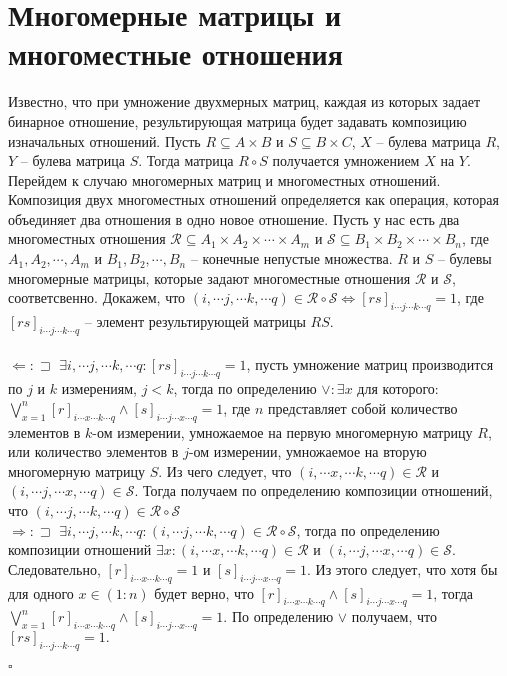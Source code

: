 \documentclass{article}
\begin{document}
\section{Многомерные матрицы и многоместные отношения}
Известно, что при умножение двухмерных матриц, каждая из которых задает бинарное отношение, результирующая матрица будет задавать композицию изначальных отношений. 
Пусть $R \subseteq A \times B$ и $S \subseteq B \times C$, $X$ -- булева матрица $R$, $Y$ -- булева матрица $S$. Тогда матрица $R \circ S $ получается умножением $X$ на $Y$.\\

Перейдем к случаю многомерных матриц и многоместных отношений. Композиция двух многоместных отношений определяется как операция, которая объединяет два отношения в одно новое отношение. Пусть у нас есть два многоместных отношения $\mathcal{R} \subseteq A_1 \times A_2 \times \cdots \times A_m$ и $\mathcal{S} \subseteq B_1 \times B_2 \times \cdots \times B_n$, где $A_1, A_2, \cdots, A_m$ и $B_1, B_2, \cdots, B_n$ -- конечные непустые множества. $R$ и $S$ -- булевы многомерные матрицы, которые задают многоместные отношения $\mathcal{R}$ и $\mathcal{S}$, соответсвенно. Докажем, что $(i, \cdots j, \cdots k, \cdots q) \in \mathcal{R} \circ \mathcal{S} \iff [rs]_{i \cdots j\cdots  k\cdots q} = 1$, где $[rs]_{i \cdots j\cdots k \cdots q}$ -- элемент результирующей матрицы $RS$.\\\\
$\Leftarrow :  \sqsupset$ $\exists i, \cdots j,\cdots k, \cdots q : [rs]_{i\cdots j\cdots k\cdots q} = 1$, пусть умножение матриц производится по $j$ и $k$ измерениям, $j<k$, тогда по определению $\vee : \exists x$ для которого: $\bigvee_{x=1}^n [r]_{i \cdots x \cdots k\cdots q} \wedge [s]_{i\cdots j \cdots x \cdots q} = 1$, где $n$ представляет собой количество элементов в $k$-ом измерении, умножаемое на первую многомерную матрицу $R$, или количество элементов в $j$-ом измерении, умножаемое на вторую многомерную матрицу $S$. Из чего следует, что $(i,\cdots x, \cdots k, \cdots q) \in \mathcal{R}$ и $(i,\cdots j,\cdots x,\cdots q) \in \mathcal{S}$. Тогда получаем по определению композиции отношений, что $(i,\cdots j,\cdots k, \cdots q) \in \mathcal{R} \circ \mathcal{S}$ \\
$\Rightarrow : \sqsupset$ $\exists i, \cdots j,\cdots k, \cdots q : (i,\cdots j,\cdots k, \cdots q) \in \mathcal{R} \circ \mathcal{S}$, тогда по определению композиции отношений $\exists x: (i,\cdots x,\cdots k, \cdots q) \in \mathcal{R}$ и $(i,\cdots j,\cdots x,\cdots q) \in \mathcal{S}$. Следовательно, $[r]_{i\cdots x\cdots k\cdots q} = 1$ и $[s]_{i\cdots j\cdots x\cdots q} = 1$. Из этого следует, что хотя бы для одного $x \in (1:n)$ будет верно, что $[r]_{i\cdots x\cdots k\cdots q} \wedge [s]_{i\cdots j\cdots x\cdots q} = 1$, тогда $\bigvee_{x=1}^n [r]_{i\cdots x\cdots k\cdots q} \wedge [s]_{i\cdots j\cdots x\cdots q} = 1$. По определению $\vee$ получаем, что $[rs]_{i\cdots j \cdots k\cdots q} = 1.$
\begin{flushright}
$\square$
\end{flushright} \\
\end{document}
